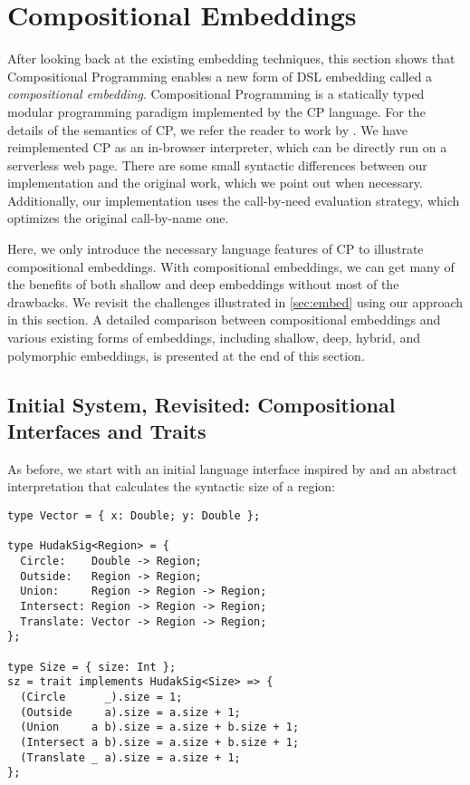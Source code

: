 \section{Compositional Embeddings} \label{sec:lang}

After looking back at the existing embedding techniques, this section shows that
Compositional Programming enables a new form of DSL embedding called a
\emph{compositional embedding}. Compositional Programming is a statically typed
modular programming paradigm implemented by the CP language. For the details of
the semantics of CP, we refer the reader to work by
\citet{zhang2021compositional}. We have reimplemented CP as an in-browser
interpreter, which can be directly run on a serverless web page. There are some
small syntactic differences between our implementation and the original work,
which we point out when necessary. Additionally, our implementation uses the
call-by-need evaluation strategy, which optimizes the original call-by-name one.

Here, we only introduce the necessary language features of CP to illustrate
compositional embeddings. With compositional embeddings, we can get many of the
benefits of both shallow and deep embeddings without most of the drawbacks. We
revisit the challenges illustrated in \autoref{sec:embed} using our approach in
this section. A detailed comparison between compositional embeddings and various
existing forms of embeddings, including shallow, deep, hybrid, and polymorphic
embeddings, is presented at the end of this section.

\subsection{Initial System, Revisited: Compositional Interfaces and Traits}

As before, we start with an initial language interface inspired by
\citet{hudak1998modular} and an abstract interpretation that calculates the
syntactic size of a region:

\begin{lstlisting}
type Vector = { x: Double; y: Double };

type HudakSig<Region> = {
  Circle:    Double -> Region;
  Outside:   Region -> Region;
  Union:     Region -> Region -> Region;
  Intersect: Region -> Region -> Region;
  Translate: Vector -> Region -> Region;
};

type Size = { size: Int };
sz = trait implements HudakSig<Size> => {
  (Circle      _).size = 1;
  (Outside     a).size = a.size + 1;
  (Union     a b).size = a.size + b.size + 1;
  (Intersect a b).size = a.size + b.size + 1;
  (Translate _ a).size = a.size + 1;
};
\end{lstlisting}

